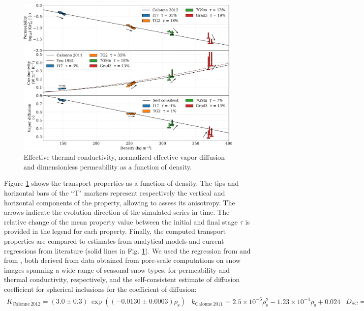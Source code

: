 \documentclass[draft,ms]{agujournal2019}
\begin{document}
\begin{figure}
    \centering
    \includegraphics[width=\linewidth]{Figures/tplot_all_arrows.pdf}
    \caption{Effective thermal conductivity, normalized effective vapor diffusion and dimensionless permeability as a function of density.}
    \label{fig:Tplot}
\end{figure}

Figure \ref{fig:Tplot} shows the transport properties as a function of density. The tips and horizontal bars of the ``T" markers represent respectively the vertical and horizontal components of the property, allowing to assess its anisotropy. The arrows indicate the evolution direction of the simulated series in time. The relative change of the mean property value between the initial and final stage $\tau$ is provided in the legend for each property. Finally, the computed transport properties are compared to estimates from analytical models and current regressions from literature (solid lines in Fig. \ref{fig:Tplot}). %
We used the regression from  and from , both derived from data obtained from pore-scale computations on snow images spanning a wide range of seasonal snow types, for permeability and thermal conductivity, respectively, and the self-consistent estimate of diffusion coefficient for spherical inclusions \cite{auriault2009homogenization} for the coefficient of diffusion:
\begin{subequations}
\begin{align}
K_{\mathrm{Calonne\ 2012}}=(3.0 \pm 0.3)\ \exp \left(\left(-0.0130 \pm 0.0003\right) \rho_{\mathrm{s}}\right)
\end{align}
\begin{align}
k_{\mathrm{Calonne\ 2011}}=2.5 \times 10^{-6} \rho_{\mathrm{s}}^{2}-1.23 \times 10^{-4} \rho_{\mathrm{s}}+0.024\end{align}
\begin{align}
D_{\mathrm{SC}} = 1 - \frac{3\rho_s}{2\rho_i}
\end{align}
\end{subequations}
\end{document}
